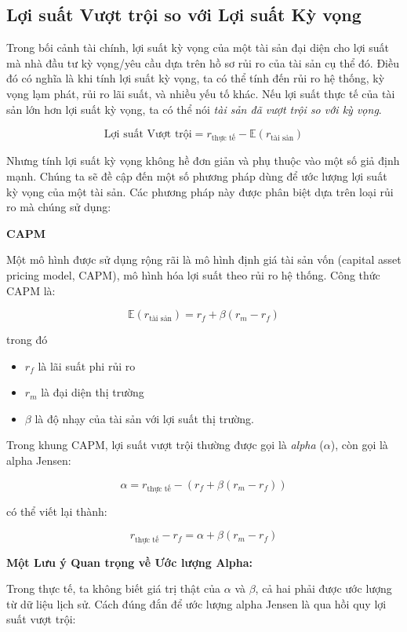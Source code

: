 \subsection{Lợi suất Vượt trội so với Lợi suất Kỳ vọng}

Trong bối cảnh tài chính, lợi suất kỳ vọng của một tài sản đại diện cho lợi suất mà nhà đầu tư kỳ vọng/yêu cầu dựa trên hồ sơ rủi ro của tài sản cụ thể đó. Điều đó có nghĩa là khi tính lợi suất kỳ vọng, ta có thể tính đến rủi ro hệ thống, kỳ vọng lạm phát, rủi ro lãi suất, và nhiều yếu tố khác. Nếu lợi suất thực tế của tài sản lớn hơn lợi suất kỳ vọng, ta có thể nói \emph{tài sản đã vượt trội so với kỳ vọng}.

$$
\text{Lợi suất Vượt trội} = r_{\text{thực tế}} - \mathbb{E}(r_{\text{tài sản}})
$$

Nhưng tính lợi suất kỳ vọng không hề đơn giản và phụ thuộc vào một số giả định mạnh. Chúng ta sẽ đề cập đến một số phương pháp dùng để ước lượng lợi suất kỳ vọng của một tài sản. Các phương pháp này được phân biệt dựa trên loại rủi ro mà chúng sử dụng:

\textbf{CAPM}

Một mô hình được sử dụng rộng rãi là mô hình định giá tài sản vốn (capital asset pricing model, CAPM), mô hình hóa lợi suất theo rủi ro hệ thống. Công thức CAPM là:

$$
\mathbb{E}(r_{\text{tài sản}}) = r_{f} + \beta (r_{m} - r_{f})
$$

trong đó
\begin{itemize}
  \item $r_{f}$ là lãi suất phi rủi ro
  \item $r_{m}$ là đại diện thị trường
  \item $\beta$ là độ nhạy của tài sản với lợi suất thị trường.
\end{itemize}

Trong khung CAPM, lợi suất vượt trội thường được gọi là \emph{alpha} ($\alpha$), còn gọi là alpha Jensen:

$$
\alpha = r_{\text{thực tế}} - \left ( r_{f} + \beta (r_{m} - r_{f}) \right )
$$

có thể viết lại thành:

$$
r_{\text{thực tế}} - r_{f} = \alpha + \beta (r_{m} - r_{f})
$$

\textbf{Một Lưu ý Quan trọng về Ước lượng Alpha:}

Trong thực tế, ta không biết giá trị thật của $\alpha$ và $\beta$, cả hai phải được ước lượng từ dữ liệu lịch sử. Cách đúng đắn để ước lượng alpha Jensen là qua hồi quy lợi suất vượt trội:

